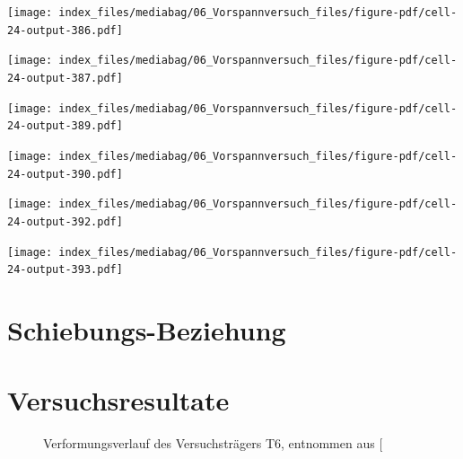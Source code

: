 \documentclass[
  11pt,
  letterpaper,
]{scrreprt}
\begin{document}
\newpage{}

\texttt{[image: index\_files/mediabag/06\_Vorspannversuch\_files/figure-pdf/cell-24-output-386.pdf]}

\texttt{[image: index\_files/mediabag/06\_Vorspannversuch\_files/figure-pdf/cell-24-output-387.pdf]}

\newpage{}

\texttt{[image: index\_files/mediabag/06\_Vorspannversuch\_files/figure-pdf/cell-24-output-389.pdf]}

\texttt{[image: index\_files/mediabag/06\_Vorspannversuch\_files/figure-pdf/cell-24-output-390.pdf]}

\newpage{}

\texttt{[image: index\_files/mediabag/06\_Vorspannversuch\_files/figure-pdf/cell-24-output-392.pdf]}

\texttt{[image: index\_files/mediabag/06\_Vorspannversuch\_files/figure-pdf/cell-24-output-393.pdf]}

\newpage{}

\section{Schiebungs-Beziehung}\label{schiebungs-beziehung}

\section{Versuchsresultate}\label{versuchsresultate}

\begin{figure}[H]


\caption{\label{fig-durchbiegung_laengs_t6}Verformungsverlauf des
Versuchsträgers T6, entnommen aus
{[}\citeproc{ref-sigrist_versuche_1993}{5}{]}}

\end{figure}%
\end{document}
